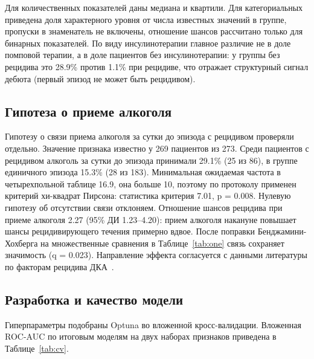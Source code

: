 \documentclass[12pt,a4paper]{article}
\begin{document}
Для количественных показателей даны медиана и квартили. Для категориальных приведена доля
характерного уровня от числа известных значений в группе, пропуски в знаменатель не
включены, отношение шансов рассчитано только для бинарных показателей. По виду
инсулинотерапии главное различие не в доле помповой терапии, а в доле пациентов без
инсулинотерапии: у группы без рецидива это 28.9\% против 1.1\% при рецидиве, что отражает
структурный сигнал дебюта (первый эпизод не может быть рецидивом).

\subsection{Гипотеза о приеме алкоголя}

Гипотезу о связи приема алкоголя за сутки до эпизода с рецидивом проверяли отдельно.
Значение признака известно у 269 пациентов из 273. Среди пациентов с рецидивом алкоголь за
сутки до эпизода принимали 29.1\% (25 из 86), в группе единичного эпизода 15.3\% (28 из
183). Минимальная ожидаемая частота в четырехпольной таблице 16.9, она больше 10, поэтому по
протоколу применен критерий хи-квадрат Пирсона: статистика критерия 7.01, p = 0.008.
Нулевую гипотезу об отсутствии связи отклоняем. Отношение шансов рецидива при приеме
алкоголя 2.27 (95\% ДИ 1.23--4.20): прием алкоголя накануне повышает шансы рецидивирующего
течения примерно вдвое. После поправки Бенджамини-Хохберга на множественные сравнения в
Таблице~\ref{tab:one} связь сохраняет значимость (q = 0.023). Направление эффекта
согласуется с данными литературы по факторам рецидива ДКА~\cite{ref7,ref15,ref16}.

\subsection{Разработка и качество модели}

Гиперпараметры подобраны Optuna во вложенной кросс-валидации. Вложенная ROC-AUC по
итоговым моделям на двух наборах признаков приведена в Таблице~\ref{tab:cv}.
\end{document}
